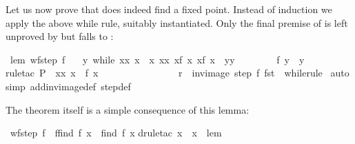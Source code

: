 \begin{isabellebody}
\begin{isamarkuptext}
Let us now prove that  does indeed find a fixed point. Instead
of induction we apply the above while rule, suitably instantiated.
Only the final premise of  is left unproved
by  but falls to :%
\end{isamarkuptext}%
\isamarkuptrue%
\ lem{\isacharcolon}\ {\isachardoublequote}wf{\isacharparenleft}step{}\ f{\isacharparenright}\ {\isasymLongrightarrow}\isanewline
\ \ {\isasymexists}y{\isachardot}\ while\ {\isacharparenleft}{\isasymlambda}{\isacharparenleft}x{\isacharcomma}x{\isacharprime}{\isacharparenright}{\isachardot}\ x{\isacharprime}\ {\isasymnoteq}\ x{\isacharparenright}\ {\isacharparenleft}{\isasymlambda}{\isacharparenleft}x{\isacharcomma}x{\isacharprime}{\isacharparenright}{\isachardot}\ {\isacharparenleft}x{\isacharprime}{\isacharcomma}f\ x{\isacharprime}{\isacharparenright}{\isacharparenright}\ {\isacharparenleft}x{\isacharcomma}f\ x{\isacharparenright}\ {\isacharequal}\ {\isacharparenleft}y{\isacharcomma}y{\isacharparenright}\ {\isasymand}\isanewline
\ \ \ \ \ \ \ f\ y\ {\isacharequal}\ y{\isachardoublequote}\isanewline
\isamarkupfalse%
rule{\isacharunderscore}tac\ P\ {\isacharequal}\ {\isachardoublequote}{\isasymlambda}{\isacharparenleft}x{\isacharcomma}x{\isacharprime}{\isacharparenright}{\isachardot}\ x{\isacharprime}\ {\isacharequal}\ f\ x{\isachardoublequote}\ \isanewline
\ \ \ \ \ \ \ \ \ \ \ \ \ \ \ r\ {\isacharequal}\ {\isachardoublequote}inv{\isacharunderscore}image\ {\isacharparenleft}step{}\ f{\isacharparenright}\ fst{\isachardoublequote}\ \ while{\isacharunderscore}rule{\isacharparenright}\isanewline
\isamarkupfalse%
\ auto\isanewline
\isamarkupfalse%
simp\ add{\isacharcolon}inv{\isacharunderscore}image{\isacharunderscore}def\ step{}{\isacharunderscore}def{\isacharparenright}\isanewline
\isamarkupfalse%
\isamarkupfalse%
%
\begin{isamarkuptext}%
The theorem itself is a simple consequence of this lemma:%
\end{isamarkuptext}%
\isamarkuptrue%
\ {\isachardoublequote}wf{\isacharparenleft}step{}\ f{\isacharparenright}\ {\isasymLongrightarrow}\ f{\isacharparenleft}find{}\ f\ x{\isacharparenright}\ {\isacharequal}\ find{}\ f\ x{\isachardoublequote}\isanewline
\isamarkupfalse%
drule{\isacharunderscore}tac\ x\ {\isacharequal}\ x\ \ lem{\isacharparenright}\isanewline

\end{isabellebody}
